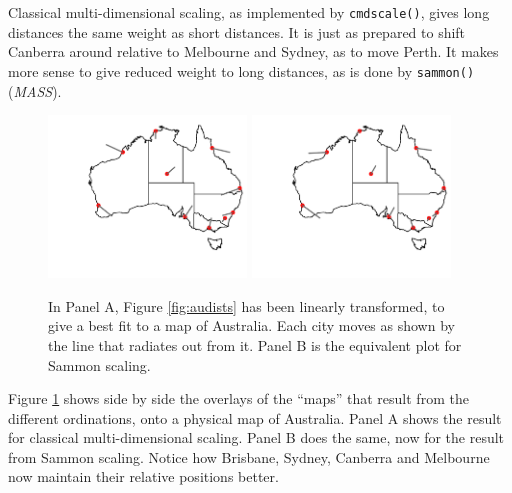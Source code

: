 \documentclass{tufte-book}\usepackage[]{graphicx}\usepackage[]{color}
\newcommand{\txtt}[1]{\texttt{#1}}
\begin{document}
Classical multi-dimensional scaling, as implemented by
 \txtt{cmdscale()}, gives long distances the same weight as short
 distances.  It is just as prepared to shift Canberra around relative
 to Melbourne and Sydney, as to move Perth.  It makes more sense to
 give reduced weight to long distances, as is done by \txtt{sammon()}
 (\textit{MASS}).




\begin{figure}[h]
\begin{Schunk}


\centerline{\includegraphics[width=0.47\textwidth]{figs/12-au-both-1} \includegraphics[width=0.47\textwidth]{figs/12-au-both-2} }

\end{Schunk}
      \caption{In Panel A, Figure \ref{fig:audists} has been linearly
        transformed, to give a best fit to a map of Australia.  Each city
        moves as shown by the line that radiates out from it.  Panel B
        is the equivalent plot for Sammon scaling.
\label{fig:aufit}}
 \end{figure}
 Figure \ref{fig:aufit} shows side by side the overlays of the
 ``maps'' that result from the different ordinations, onto a physical
 map of Australia.  Panel A shows the result for classical
 multi-dimensional scaling.  Panel B does the same, now for the result
 from Sammon scaling.  Notice how Brisbane, Sydney, Canberra and
 Melbourne now maintain their relative positions better.
\end{document}
